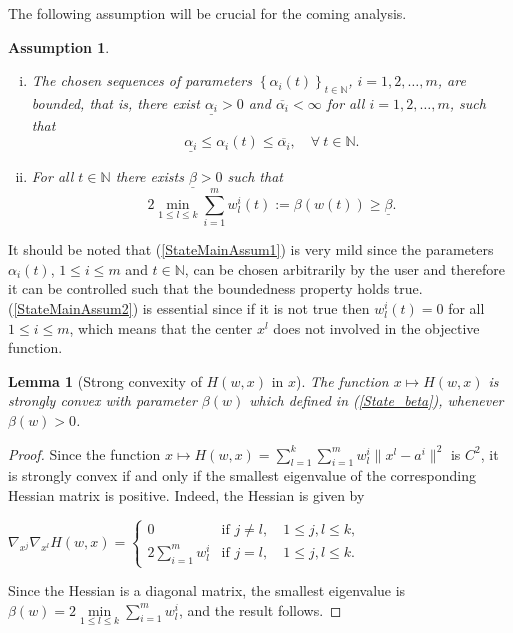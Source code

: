 \documentclass[11pt]{article}
\numberwithin{equation}{section}
\newtheorem{lemma}{Lemma}[proposition]
\newtheorem{assumption}{Assumption}
\begin{document}
The following assumption will be crucial for the coming analysis.
\begin{assumption} \label{StateMainAssum}
\begin{enumerate}[(i)] 
	\item The chosen sequences of parameters $\left\lbrace \alpha_i(t) \right\rbrace_{t \in \mathbb{N}}$, $i=1,2, \ldots, m$, are bounded, that is, there exist $\underline{\alpha_i} > 0$ and $\overline{\alpha_i} < \infty$ for all $i=1,2, \ldots, m$, such that
		\begin{equation}
			\underline{\alpha_i} \leq \alpha_i(t) \leq \overline{\alpha_i}, \quad \forall \: t \in \mathbb{N}.
		\end{equation}		 \label{StateMainAssum1}
	\item For all $t \in \mathbb{N}$ there exists $\underline{\beta} > 0$ such that
		\begin{equation}
			2 \min\limits_{1 \leq l \leq k} \sum\limits_{i=1}^{m} w^i_l(t) := \beta(w(t)) \geq \underline{\beta}. \label{State_beta}
		\end{equation}		 \label{StateMainAssum2}
\end{enumerate}
\end{assumption}
It should be noted that (\ref{StateMainAssum1}) is very mild since the parameters $\alpha_i(t)$, $1 \leq i \leq m$ and $t \in \mathbb{N}$, can be chosen arbitrarily by the user and therefore it can be controlled such that the boundedness property holds true. (\ref{StateMainAssum2}) is essential since if it is not true then $w^i_l(t)=0$ for all $1 \leq i \leq m$, which means that the center $x^l$ does not involved in the objective function.

\begin{lemma}[Strong convexity of $H(w,x)$ in $x$] \label{StateEq14}
The function $x \mapsto H(w,x)$ is strongly convex with parameter $\beta(w)$ which defined in (\ref{State_beta}), whenever $\beta(w) > 0$.
\end{lemma}

\begin{proof}
Since the function $x \mapsto H(w,x) = 
\sum\limits_{l=1}^{k} \sum\limits_{i=1}^{m} w^i_l \|x^l - a^i\|^2$ is $C^2$, it is strongly convex if and only if the smallest eigenvalue of the corresponding Hessian matrix is positive. Indeed, the Hessian is given by

\begin{center}
$\nabla_{x^j} \nabla_{x^l} H(w,x) = 
\begin{cases} 0 &\mbox{if } j \neq l, \quad 1 \leq j,l \leq k ,
\\ 2\sum\limits_{i=1}^{m} w^i_l &\mbox{if } j = l, \quad 1 \leq j,l \leq k. \end{cases} $
\end{center}

Since the Hessian is a diagonal matrix, the smallest eigenvalue is $\beta(w) = 2\min\limits_{1 \leq l \leq k} \sum\limits_{i=1}^{m} w^i_l$, and the result follows.
\end{proof}
\end{document}
